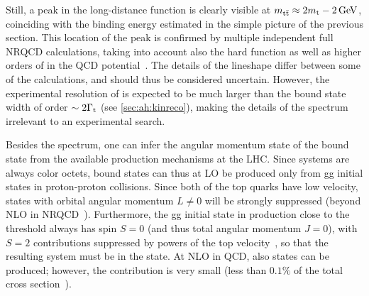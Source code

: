 Still, a peak in the long-distance function is clearly visible at $\mtt \approx 2 \mt - \SI{2}{\GeV}$, coinciding with the binding energy estimated in the simple picture of the previous section. This location of the peak is confirmed by multiple independent full NRQCD calculations, taking into account also the hard function as well as higher orders of \alphas in the QCD potential~\cite{Fadin:1990wx,Kiyo:2008bv,Sumino:2010bv,Ju:2020otc,Garzelli:2024uhe}. The details of the lineshape differ between some of the calculations, and should thus be considered uncertain. However, the experimental resolution of \mtt is expected to be much larger than the bound state width of order $\sim 2 \Gamma_{\mathrm{t}}$ (see \cref{sec:ah:kinreco}), making the details of the spectrum irrelevant to an experimental search.

Besides the \mtt spectrum, one can infer the angular momentum state of the \ttbar bound state from the available production mechanisms at the LHC. Since \qqbar systems are always color octets, \ttbar bound states can thus at LO be produced only from gg initial states in proton-proton collisions. Since both of the top quarks have low velocity, states with orbital angular momentum $L \neq 0$ will be strongly suppressed (beyond NLO in NRQCD~\cite{Kiyo:2008bv}). Furthermore, the gg initial state in \ttbar production close to the \ttbar threshold always has spin $S = 0$ (and thus total angular momentum $J = 0$), with $S = 2$ contributions suppressed by powers of the top velocity~\cite{Cheng:2024btk}, so that the resulting \ttbar system must be in the  state. At NLO in QCD, also  states can be produced; however, the contribution is very small (less than $0.1\%$ of the total cross section~\cite{Kiyo:2008bv}).


